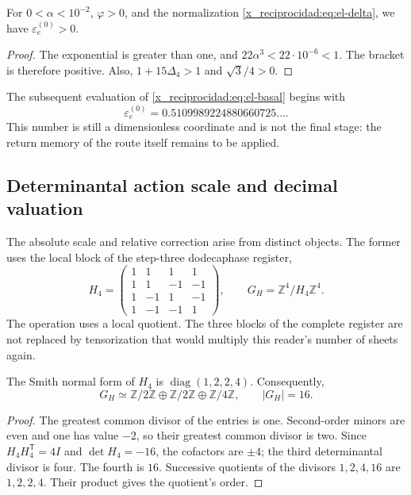 \begin{proposition}
For \(0<\alpha<10^{-2}\), \(\varphi>0\), and the normalization
\eqref{x_reciprocidad:eq:el-delta}, we have \(\varepsilon_e^{(0)}>0\).
\end{proposition}
\begin{proof}
The exponential is greater than one, and
\(22\alpha^3<22\cdot10^{-6}<1\). The bracket is therefore positive.
Also, \(1+15\Delta_4>1\) and \(\sqrt3/4>0\).
\end{proof}

The subsequent evaluation of \eqref{x_reciprocidad:eq:el-basal} begins with
\[
 \varepsilon_e^{(0)}=0.5109989224880660725\ldots.
\]
This number is still a dimensionless coordinate and is not the
final stage: the return memory of the route itself remains to be applied.

\subsection{Determinantal action scale and decimal valuation}

The absolute scale and relative correction arise from distinct objects. The former uses the local block of the step-three dodecaphase register,
\begin{equation}
 H_4=\begin{pmatrix}
 1&1&1&1\\1&1&-1&-1\\1&-1&1&-1\\1&-1&-1&1
 \end{pmatrix},\qquad
 G_H=\mathbb Z^4/H_4\mathbb Z^4.
 \label{x_reciprocidad:eq:el-h4}
\end{equation}
The operation uses a local quotient. The three blocks of the complete register are not replaced by tensorization that would multiply this reader's number of sheets again.

\begin{lemma}
The Smith normal form of \(H_4\) is
\(\operatorname{diag}(1,2,2,4)\). Consequently,
\[
 G_H\simeq\mathbb Z/2\mathbb Z\oplus\mathbb Z/2\mathbb Z
 \oplus\mathbb Z/4\mathbb Z,\qquad |G_H|=16.
\]
\end{lemma}
\begin{proof}
The greatest common divisor of the entries is one. Second-order minors are even and one has value \(-2\), so their greatest common divisor is two. Since \(H_4H_4^{\mathsf T}=4I\) and \(\det H_4=-16\), the cofactors are \(\pm4\); the third determinantal divisor is four. The fourth is \(16\). Successive quotients of the divisors \(1,2,4,16\) are \(1,2,2,4\). Their product gives the quotient's order.
\end{proof}


